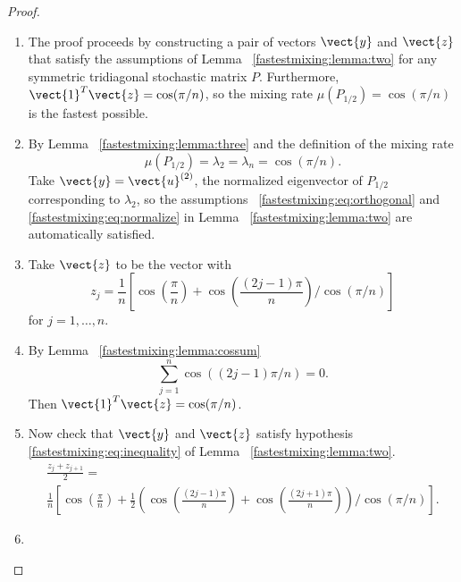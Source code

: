 \documentclass[12pt]{article}
\begin{document}
\begin{proof}
    \begin{enumerate}
        \item
            The proof proceeds by constructing a pair of vectors \(
            \vect{y} \) and \( \vect{z} \) that satisfy the assumptions
            of Lemma~%
            \ref{fastestmixing:lemma:two} for any symmetric
            tridiagonal stochastic matrix \( P \).  Furthermore, \(
            \vect{1}^T \vect{z} = \cos(\pi/n) \), so the mixing rate \(
            \mu(P_{1/2}) = \cos(\pi/n) \) is the fastest possible.
        \item
            By Lemma~%
            \ref{fastestmixing:lemma:three} and the definition of the
            mixing rate
            \[
                \mu(P_{1/2}) = \lambda_2 = \lambda_n = \cos(\pi/n).
            \] Take \( \vect{y} = \vect{u}^{(2)} \), the normalized
            eigenvector of \( P_{1/2} \) corresponding to \( \lambda_2 \),
            so the assumptions~%
            \eqref{fastestmixing:eq:orthogonal} and~%
            \eqref{fastestmixing:eq:normalize} in Lemma~%
            \ref{fastestmixing:lemma:two} are automatically satisfied.
        \item
            Take \( \vect{z} \) to be the vector with
            \[
                z_j = \frac{1}{n} \left[ \cos\left(\frac{\pi}{n}\right)
                + \cos\left( \frac{(2j-1)\pi }{n } \right) \bigg/ \cos\left
                ( \pi/n \right) \right]
            \] for \( j = 1, \dots, n \).
        \item
            By Lemma~%
            \ref{fastestmixing:lemma:cossum}
            \[
                \sum_{j=1}^{n} \cos((2j-1)\pi/n) = 0.
            \] Then \( \vect{1}^T \vect{z} = \cos(\pi/n) \).
        \item
            Now check that \( \vect{y} \) and \( \vect{z} \) satisfy
            hypothesis~%
            \eqref{fastestmixing:eq:inequality} of Lemma~%
            \ref{fastestmixing:lemma:two}.
            \begin{multline*}
              \frac{z_j + z_{j+1}}{2} = \\
              \frac{1}{n} \left[ \cos\left(\frac
                {\pi} {n}\right) + \frac{1}{2} \left( \cos\left( \frac{(2j-1)\pi
                }{n } \right) + \cos\left( \frac{(2j+1)\pi }{n } \right)
                \right) \bigg/ \cos\left(\pi/n \right) \right].
            \end{multline*}
        \item

\end{enumerate}
\end{proof}
\end{document}

